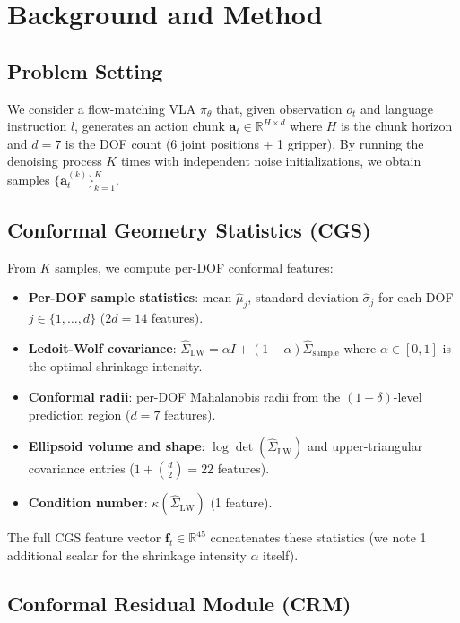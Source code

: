 \documentclass[letterpaper]{article}
\begin{document}
\section{Background and Method}

\subsection{Problem Setting}

We consider a flow-matching VLA $\pi_\theta$ that, given observation $o_t$ and language instruction $l$, generates an action chunk $\mathbf{a}_t \in \mathbb{R}^{H \times d}$ where $H$ is the chunk horizon and $d{=}7$ is the DOF count (6 joint positions + 1 gripper).
By running the denoising process $K$ times with independent noise initializations, we obtain samples $\{\mathbf{a}_t^{(k)}\}_{k=1}^K$.

\subsection{Conformal Geometry Statistics (CGS)}

From $K$ samples, we compute per-DOF conformal features:
\begin{itemize}
    \item \textbf{Per-DOF sample statistics}: mean $\hat{\mu}_j$, standard deviation $\hat{\sigma}_j$ for each DOF $j \in \{1,\ldots,d\}$ ($2d{=}14$ features).
    \item \textbf{Ledoit-Wolf covariance}: $\hat{\Sigma}_{\text{LW}} = \alpha I + (1-\alpha) \hat{\Sigma}_{\text{sample}}$ where $\alpha \in [0,1]$ is the optimal shrinkage intensity.
    \item \textbf{Conformal radii}: per-DOF Mahalanobis radii from the $(1-\delta)$-level prediction region ($d{=}7$ features).
    \item \textbf{Ellipsoid volume and shape}: $\log\det(\hat{\Sigma}_{\text{LW}})$ and upper-triangular covariance entries ($1 + \binom{d}{2}{=}22$ features).
    \item \textbf{Condition number}: $\kappa(\hat{\Sigma}_{\text{LW}})$ (1 feature).
\end{itemize}
The full CGS feature vector $\mathbf{f}_t \in \mathbb{R}^{45}$ concatenates these statistics (we note 1 additional scalar for the shrinkage intensity $\alpha$ itself).

\subsection{Conformal Residual Module (CRM)}
\end{document}

